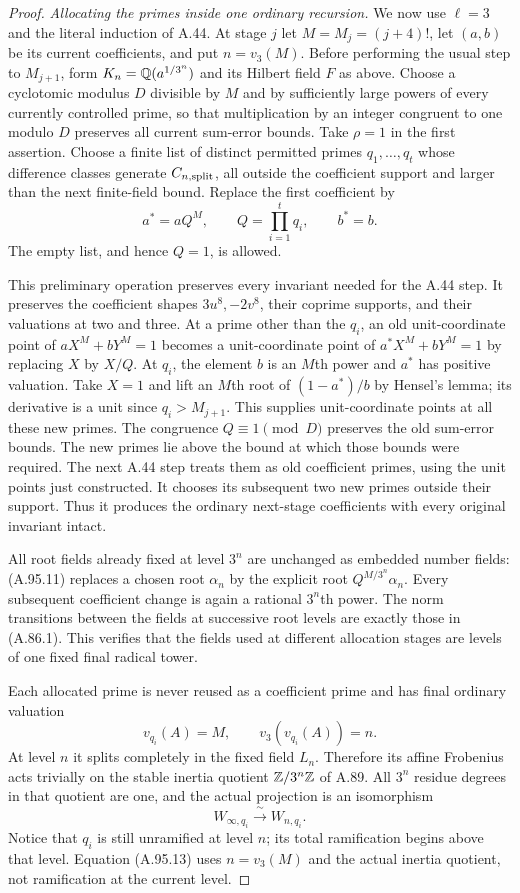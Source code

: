\begin{proof}
\emph{Allocating the primes inside one ordinary recursion.}
We now use $\ell=3$ and the literal induction of A.44.
At stage $j$ let $M=M_j=(j+4)!$, let $(a,b)$ be its
current coefficients, and put $n=v_3(M)$.
Before performing the usual step to $M_{j+1}$, form
$K_n=\mathbb Q(a^{1/3^n})$ and its Hilbert field $F$ as above.
Choose a cyclotomic modulus $D$ divisible by $M$ and by
sufficiently large powers of every currently controlled
prime, so that multiplication by an integer congruent
to one modulo $D$ preserves all current sum-error bounds.
Take $\rho=1$ in the first assertion.
Choose a finite list of distinct permitted primes
$q_1,\ldots,q_t$ whose difference classes generate
$C_{n,\rm split}$, all outside the coefficient support
and larger than the next finite-field bound.
Replace the first coefficient by
\[
                   a^*=a Q^M,\qquad Q=\prod_{i=1}^t q_i,
                    \qquad b^*=b.
 \tag{A.95.11}
\]
The empty list, and hence $Q=1$, is allowed.

This preliminary operation preserves every invariant
needed for the A.44 step.
It preserves the coefficient shapes $3u^8,-2v^8$, their
coprime supports, and their valuations at two and three.
At a prime other than the $q_i$, an old unit-coordinate
point of $aX^M+bY^M=1$ becomes a unit-coordinate point of
$a^*X^M+bY^M=1$ by replacing $X$ by $X/Q$.
At $q_i$, the element $b$ is an $M$th power and
$a^*$ has positive valuation.  Take $X=1$ and lift an
$M$th root of $(1-a^*)/b$ by Hensel's lemma; its derivative
is a unit since $q_i>M_{j+1}$.
This supplies unit-coordinate points at all these new primes.
The congruence $Q\equiv1\pmod D$ preserves the old
sum-error bounds.  The new primes lie above the bound
at which those bounds were required.
The next A.44 step treats them as old coefficient primes,
using the unit points just constructed.
It chooses its subsequent two new primes outside their
support.  Thus it produces the ordinary next-stage
coefficients with every original invariant intact.

All root fields already fixed at level $3^n$ are unchanged
as embedded number fields: (A.95.11) replaces a chosen
root $\alpha_n$ by the explicit root
$Q^{M/3^n}\alpha_n$.
Every subsequent coefficient change is again a rational
$3^n$th power.
The norm transitions between the fields at successive
root levels are exactly those in (A.86.1).
This verifies that the fields used at different allocation
stages are levels of one fixed final radical tower.

Each allocated prime is never reused as a coefficient
prime and has final ordinary valuation
\[
               v_{q_i}(A)=M,\qquad v_3(v_{q_i}(A))=n.
 \tag{A.95.12}
\]
At level $n$ it splits completely in the fixed field
$L_n$.  Therefore its affine Frobenius acts trivially
on the stable inertia quotient $\mathbb Z/3^n\mathbb Z$ of A.89.
All $3^n$ residue degrees in that quotient are one,
and the actual projection is an isomorphism
\[
           W_{\infty,q_i}\xrightarrow{\ \sim\ }W_{n,q_i}.
 \tag{A.95.13}
\]
Notice that $q_i$ is still unramified at level $n$;
its total ramification begins above that level.
Equation (A.95.13) uses $n=v_3(M)$ and the actual
inertia quotient, not ramification at the current level.


\end{proof}
